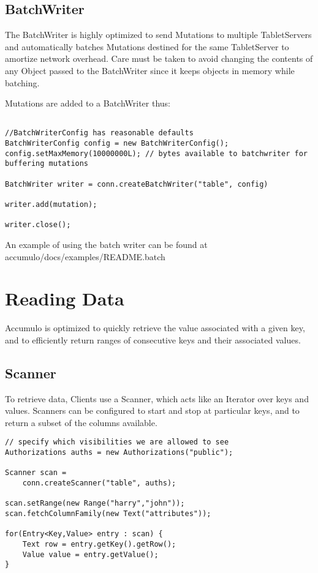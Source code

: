 \subsection{BatchWriter}
The BatchWriter is highly optimized to send Mutations to multiple TabletServers
and automatically batches Mutations destined for the same TabletServer to
amortize network overhead. Care must be taken to avoid changing the contents of
any Object passed to the BatchWriter since it keeps objects in memory while
batching.

Mutations are added to a BatchWriter thus:

\small
\begin{verbatim}

//BatchWriterConfig has reasonable defaults
BatchWriterConfig config = new BatchWriterConfig();
config.setMaxMemory(10000000L); // bytes available to batchwriter for buffering mutations

BatchWriter writer = conn.createBatchWriter("table", config)

writer.add(mutation);

writer.close();
\end{verbatim}
\normalsize

An example of using the batch writer can be found at\\
accumulo/docs/examples/README.batch

\section{Reading Data}

Accumulo is optimized to quickly retrieve the value associated with a given key, and
to efficiently return ranges of consecutive keys and their associated values.

\subsection{Scanner}

To retrieve data, Clients use a Scanner, which acts like an Iterator over
keys and values. Scanners can be configured to start and stop at particular keys, and
to return a subset of the columns available.

\small
\begin{verbatim}
// specify which visibilities we are allowed to see
Authorizations auths = new Authorizations("public");

Scanner scan =
    conn.createScanner("table", auths);

scan.setRange(new Range("harry","john"));
scan.fetchColumnFamily(new Text("attributes"));

for(Entry<Key,Value> entry : scan) {
    Text row = entry.getKey().getRow();
    Value value = entry.getValue();
}
\end{verbatim}
\normalsize

